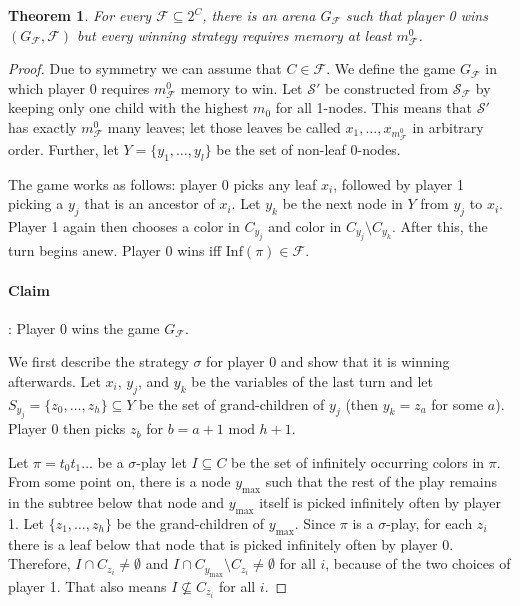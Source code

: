 \documentclass{article}
\newtheorem{theorem}{Theorem}
\begin{document}
\vspace{0.5cm}
\begin{theorem}
	For every $\mathcal{F} \subseteq 2^C$, there is an arena $G_\mathcal{F}$ such that player 0 wins $(G_\mathcal{F}, \mathcal{F})$ but every winning strategy requires memory at least $m^0_\mathcal{F}$.
\end{theorem}
\begin{proof}
	Due to symmetry we can assume that $C \in \mathcal{F}$.	We define the game $G_\mathcal{F}$ in which player 0 requires $m^0_\mathcal{F}$ memory to win. Let $\mathcal{S}'$ be constructed from $\mathcal{S}_\mathcal{F}$ by keeping only one child with the highest $m_0$ for all 1-nodes. This means that $\mathcal{S}'$ has exactly $m^0_\mathcal{F}$ many leaves; let those leaves be called $x_1, \dots, x_{m^0_\mathcal{F}}$ in arbitrary order. Further, let $Y = \{y_1, \dots, y_l\}$ be the set of non-leaf 0-nodes.
	
	The game works as follows: player 0 picks any leaf $x_i$, followed by player 1 picking a $y_j$ that is an ancestor of $x_i$. Let $y_k$ be the next node in $Y$ from $y_j$ to $x_i$. Player 1 again then chooses a color in $C_{y_j}$ and color in $C_{y_j} \setminus C_{y_k}$. After this, the turn begins anew. Player 0 wins iff $\text{Inf}(\pi) \in \mathcal{F}$.
	
	\paragraph{Claim}: Player 0 wins the game $G_\mathcal{F}$.
	
	We first describe the strategy $\sigma$ for player 0 and show that it is winning afterwards. Let $x_i$, $y_j$, and $y_k$ be the variables of the last turn and let $S_{y_j} = \{z_0, \dots, z_h\} \subseteq Y$ be the set of grand-children of $y_j$ (then $y_k = z_a$ for some $a$). Player 0 then picks $z_b$ for $b = a+1 \text{ mod } h+1$.
	
	Let $\pi = t_0 t_1 \dots$ be a $\sigma$-play let $I \subseteq C$ be the set of infinitely occurring colors in $\pi$. From some point on, there is a node $y_{\max}$ such that the rest of the play remains in the subtree below that node and $y_{\max}$ itself is picked infinitely often by player 1. Let $\{z_1, \dots, z_h\}$ be the grand-children of $y_{\max}$. Since $\pi$ is a $\sigma$-play, for each $z_i$ there is a leaf below that node that is picked infinitely often by player 0. Therefore, $I \cap C_{z_i} \neq \emptyset$ and $I \cap C_{y_{\max}} \setminus C_{z_i} \neq \emptyset$ for all $i$, because of the two choices of player 1. That also means $I \not\subseteq C_{z_i}$ for all $i$.
	

\end{proof}
\end{document}
